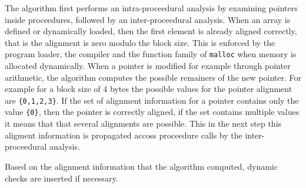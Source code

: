 \documentclass[a4paper,10pt]{article}
\begin{document}
The algorithm first performs an intra-proceedural analysis by examining pointers inside proceedures, followed by an inter-proceedural
analysis. When an array is defined or dynamically loaded, then the first element is already aligned correctly, that is the alignment
is zero modulo the block size. This is enforced by the program loader, the compiler and the function family of \lstinline|malloc|
when memory is allocated dynamically. When a pointer is modified for example through pointer arithmetic, the algorithm computes the
possible remainers of the new pointer. For example for a block size of 4 bytes the possible values for the pointer alignment are
\lstinline|{0,1,2,3}|. If the set of alignment information for a pointer contains only the value \lstinline|{0}|, then the pointer
is correctly aligned, if the set contains multiple values it means that that several alignments are possible. This in the next step
this aligment information is propagated accoss proceedure calls by the inter-proceedural analysis.

Based on the alignment information that the algorithm computed, dynamic checks are inserted if necessary.
\end{document}
